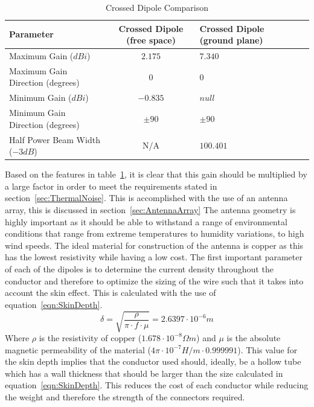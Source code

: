 \documentclass[11pt]{witseiepaper}
\begin{document}
\begin{bibunit}[witseie]
\begin{table}[htb]
    \caption{Crossed Dipole Comparison}
    \label{tab:AntennaConfigurations}
    \begin{center}
        \begin{tabular}{p{60mm}cp{40mm}cp{40mm}}
            \hline 
            Parameter & Crossed Dipole (free space) & Crossed Dipole (ground plane) \\
            \hline
            Maximum Gain ($dBi$) & $2.175$ & $7.340$ \\
            Maximum Gain Direction (degrees) & $0$ & $0$ \\
            Minimum Gain ($dBi$) & $-0.835$ & $null$ \\
            Minimum Gain Direction (degrees) & $\pm 90$ & $\pm 90$ \\
            Half Power Beam Width ($-3 dB$) & N/A & $100.401$ \\
            \hline
        \end{tabular}
    \end{center}
\end{table}
Based on the features in table~\ref{tab:AntennaConfigurations}, it is clear that this gain should be multiplied by a large factor in order to meet the requirements stated in section~\ref{sec:ThermalNoise}. This is accomplished with the use of an antenna array, this is discussed in section~\ref{sec:AntennaArray}
The antenna geometry is highly important as it should be able to withstand a range of environmental conditions that range from extreme temperatures to humidity variations, to high wind speeds.
The ideal material for construction of the antenna is copper as this has the lowest resistivity while having a low cost. The first important parameter of each of the dipoles is to determine the current density throughout the conductor and therefore to optimize the sizing of the wire such that it takes into account the skin effect. This is calculated with the use of equation~\ref{eqn:SkinDepth}.
\begin{equation} \label{eqn:SkinDepth}
\delta = \sqrt{\frac{\rho}{\pi \cdot f \cdot \mu}} = 2.6397 \cdot 10^{-6} m
\end{equation}
Where $\rho$ is the resistivity of copper ($1.678 \cdot 10^{-8} \Omega m$) and $\mu$ is the absolute magnetic permeability of the material ($4 \pi \cdot 10^{-7} H/m \cdot 0.999991$).
This value for the skin depth implies that the conductor used should, ideally, be a hollow tube which has a wall thickness that should be larger than the size calculated in equation~\ref{eqn:SkinDepth}. This reduces the cost of each conductor while reducing the weight and therefore the strength of the connectors required.

\end{bibunit}
\end{document}
